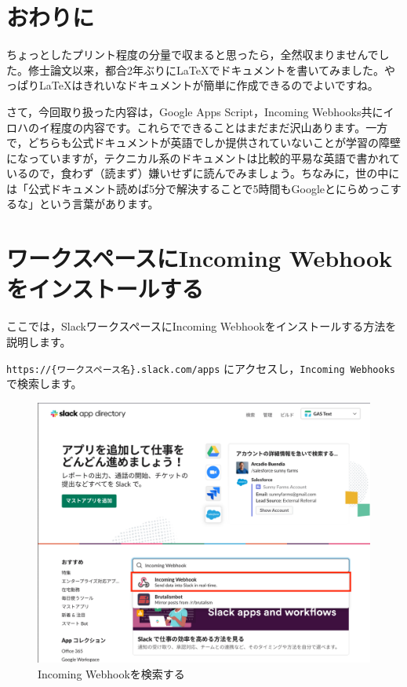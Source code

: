 \documentclass[uplatex,a4j]{jsarticle}
\begin{document}
\section{おわりに}


ちょっとしたプリント程度の分量で収まると思ったら，全然収まりませんでした。修士論文以来，都合2年ぶりに\LaTeX でドキュメントを書いてみました。やっぱり\LaTeX はきれいなドキュメントが簡単に作成できるのでよいですね。


さて，今回取り扱った内容は，Google Apps Script，Incoming Webhooks共にイロハのイ程度の内容です。これらでできることはまだまだ沢山あります。一方で，どちらも公式ドキュメントが英語でしか提供されていないことが学習の障壁になっていますが，テクニカル系のドキュメントは比較的平易な英語で書かれているので，食わず（読まず）嫌いせずに読んでみましょう。ちなみに，世の中には「公式ドキュメント読めば5分で解決することで5時間もGoogleとにらめっこするな」という言葉があります\footnotemark。

\clearpage
\appendix

\section{ワークスペースにIncoming Webhookをインストールする}
\label{appendix:install incoming webhooks}

ここでは，SlackワークスペースにIncoming Webhookをインストールする方法を説明します。

\verb|https://{ワークスペース名}.slack.com/apps| にアクセスし，\verb|Incoming Webhooks|で検索します。

\begin{figure}[H]
 \centering
 \includegraphics[keepaspectratio, scale=0.4]{images/search_incoming_webhook.png}
 \caption{Incoming Webhookを検索する}
 \label{fig:search_incoming_webhook}
\end{figure}
\end{document}
